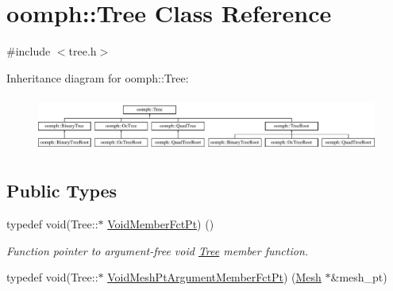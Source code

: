 \hypertarget{classoomph_1_1Tree}{}\section{oomph\+:\+:Tree Class Reference}
\label{classoomph_1_1Tree}


{\ttfamily \#include $<$tree.\+h$>$}

Inheritance diagram for oomph\+:\+:Tree\+:\begin{figure}[H]
\begin{center}
\leavevmode
\includegraphics[height=1.854305cm]{classoomph_1_1Tree}
\end{center}
\end{figure}
\subsection*{Public Types}
\begin{DoxyCompactItemize}
\item 
typedef void(Tree\+::$\ast$ \hyperlink{classoomph_1_1Tree_af04461175b6345658a215ecf039eb69e}{Void\+Member\+Fct\+Pt}) ()
\begin{DoxyCompactList}\small\item\em Function pointer to argument-\/free void \hyperlink{classoomph_1_1Tree}{Tree} member function. \end{DoxyCompactList}\item 
typedef void(Tree\+::$\ast$ \hyperlink{classoomph_1_1Tree_a3e690483c4f28d0a34b24b6ef7eba7f0}{Void\+Mesh\+Pt\+Argument\+Member\+Fct\+Pt}) (\hyperlink{classoomph_1_1Mesh}{Mesh} $\ast$\&mesh\+\_\+pt)
\end{DoxyCompactItemize}
